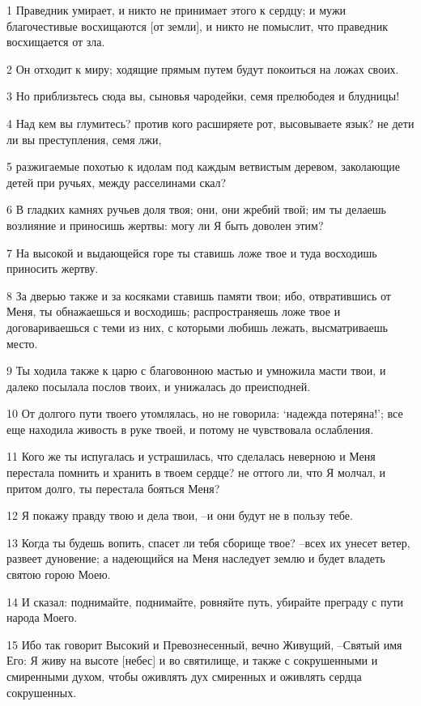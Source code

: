 \par 1 Праведник умирает, и никто не принимает этого к сердцу; и мужи благочестивые восхищаются [от земли], и никто не помыслит, что праведник восхищается от зла.
\par 2 Он отходит к миру; ходящие прямым путем будут покоиться на ложах своих.
\par 3 Но приблизьтесь сюда вы, сыновья чародейки, семя прелюбодея и блудницы!
\par 4 Над кем вы глумитесь? против кого расширяете рот, высовываете язык? не дети ли вы преступления, семя лжи,
\par 5 разжигаемые похотью к идолам под каждым ветвистым деревом, заколающие детей при ручьях, между расселинами скал?
\par 6 В гладких камнях ручьев доля твоя; они, они жребий твой; им ты делаешь возлияние и приносишь жертвы: могу ли Я быть доволен этим?
\par 7 На высокой и выдающейся горе ты ставишь ложе твое и туда восходишь приносить жертву.
\par 8 За дверью также и за косяками ставишь памяти твои; ибо, отвратившись от Меня, ты обнажаешься и восходишь; распространяешь ложе твое и договариваешься с теми из них, с которыми любишь лежать, высматриваешь место.
\par 9 Ты ходила также к царю с благовонною мастью и умножила масти твои, и далеко посылала послов твоих, и унижалась до преисподней.
\par 10 От долгого пути твоего утомлялась, но не говорила: `надежда потеряна!'; все еще находила живость в руке твоей, и потому не чувствовала ослабления.
\par 11 Кого же ты испугалась и устрашилась, что сделалась неверною и Меня перестала помнить и хранить в твоем сердце? не оттого ли, что Я молчал, и притом долго, ты перестала бояться Меня?
\par 12 Я покажу правду твою и дела твои, --и они будут не в пользу тебе.
\par 13 Когда ты будешь вопить, спасет ли тебя сборище твое? --всех их унесет ветер, развеет дуновение; а надеющийся на Меня наследует землю и будет владеть святою горою Моею.
\par 14 И сказал: поднимайте, поднимайте, ровняйте путь, убирайте преграду с пути народа Моего.
\par 15 Ибо так говорит Высокий и Превознесенный, вечно Живущий, --Святый имя Его: Я живу на высоте [небес] и во святилище, и также с сокрушенными и смиренными духом, чтобы оживлять дух смиренных и оживлять сердца сокрушенных.
